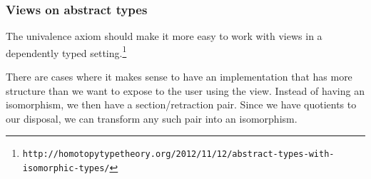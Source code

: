 
\subsubsection{Views on abstract types}


The univalence axiom should make it more easy to work with views in a
dependently typed
setting.\footnote{\verb+http://homotopytypetheory.org/2012/11/12/abstract-types-with-isomorphic-types/+}

There are cases where it makes sense to have an implementation that
has more structure than we want to expose to the user using the
view. Instead of having an isomorphism, we then have a
section/retraction pair. Since we have quotients to our disposal, we
can transform any such pair into an isomorphism.


